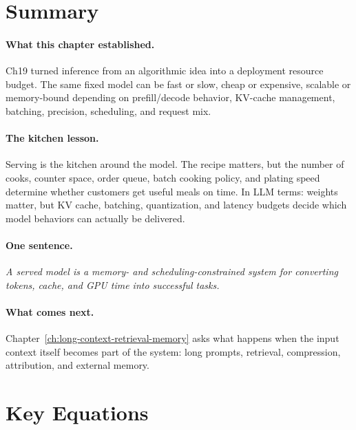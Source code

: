 \section*{Summary}

\paragraph{What this chapter established.} Ch19 turned inference from an algorithmic idea into a deployment resource budget. The same fixed model can be fast or slow, cheap or expensive, scalable or memory-bound depending on prefill/decode behavior, KV-cache management, batching, precision, scheduling, and request mix.

\paragraph{The kitchen lesson.} Serving is the kitchen around the model. The recipe matters, but the number of cooks, counter space, order queue, batch cooking policy, and plating speed determine whether customers get useful meals on time. In LLM terms: weights matter, but KV cache, batching, quantization, and latency budgets decide which model behaviors can actually be delivered.

\paragraph{One sentence.} \emph{A served model is a memory- and scheduling-constrained system for converting tokens, cache, and GPU time into successful tasks.}

\paragraph{What comes next.} Chapter~\ref{ch:long-context-retrieval-memory} asks what happens when the input context itself becomes part of the system: long prompts, retrieval, compression, attribution, and external memory.

\section*{Key Equations}

